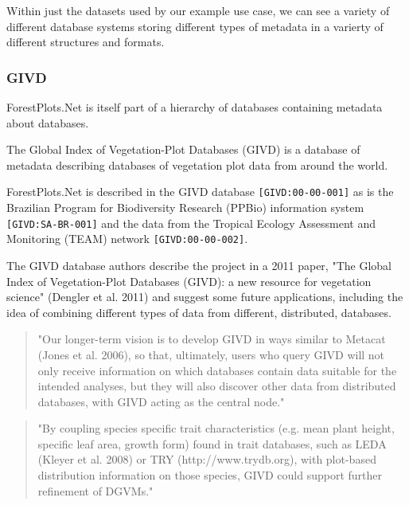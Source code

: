 \documentclass{article}
\begin{document}
Within just the datasets used by our example use case, we can see a variety of
different database systems storing different types of metadata in a varierty of
different structures and formats.

\subsubsection{GIVD}

ForestPlots.Net is itself part of a hierarchy of databases containing metadata
about databases.

The Global Index of Vegetation-Plot Databases (GIVD)
is a database of metadata describing databases of vegetation plot data
from around the world.

\noindent
ForestPlots.Net is described in the GIVD database
\texttt{[GIVD:00-00-001]}
as is the Brazilian Program for Biodiversity Research (PPBio) information system
\texttt{[GIVD:SA-BR-001]}	
and the data from the 
Tropical Ecology Assessment and Monitoring (TEAM) network
\texttt{[GIVD:00-00-002]}.


The GIVD database authors describe the project in a 2011 paper,
"The Global Index of Vegetation-Plot Databases (GIVD): a new resource for vegetation science"
(Dengler et al. 2011)
and suggest some future applications, including the idea of combining
different types of data from different, distributed, databases.

\begin{quote}
"Our longer-term vision is to develop GIVD in ways similar to Metacat (Jones et
al. 2006), so that, ultimately, users who query GIVD will not only receive
information on which databases contain data suitable for the intended analyses,
but they will also discover other data from distributed databases, with GIVD
acting as the central node."
\end{quote}

\begin{quote}
"By coupling species specific trait characteristics (e.g. mean plant height,
specific leaf area, growth form) found in trait databases, such as LEDA (Kleyer
et al. 2008) or TRY (http://www.trydb.org), with plot-based distribution
information on those species, GIVD could support further refinement of DGVMs."
\end{quote}
\end{document}
